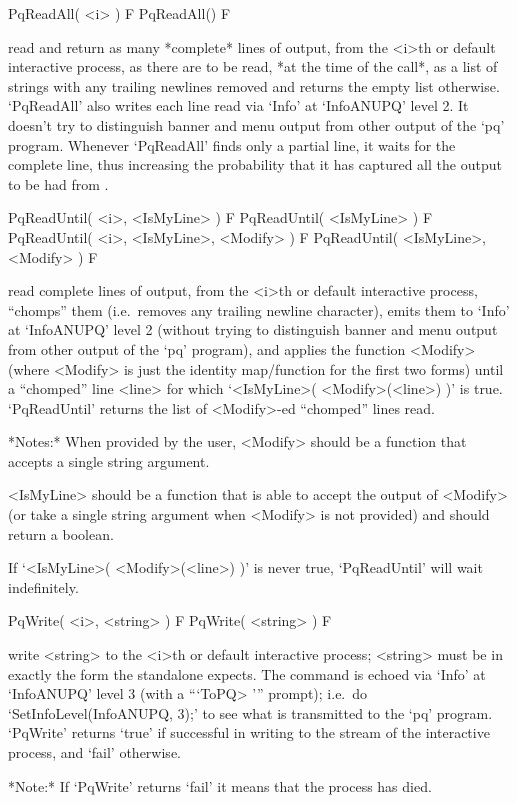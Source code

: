 \>PqReadAll( <i> ) F
\>PqReadAll() F

read and return as many *complete* lines of  {\ANUPQ}  output,  from  the
<i>th or default interactive {\ANUPQ} process, as there are to  be  read,
*at the time of the call*,  as  a  list  of  strings  with  any  trailing
newlines removed and returns the empty list otherwise.  `PqReadAll'  also
writes each line read via `Info' at `InfoANUPQ' level 2. It  doesn't  try
to distinguish banner and menu output  from  other  output  of  the  `pq'
program. Whenever `PqReadAll' finds only a partial line, it waits for  the
complete line, thus increasing the probability that it has  captured  all
the output to be had from {\ANUPQ}.

\>PqReadUntil( <i>, <IsMyLine> ) F
\>PqReadUntil( <IsMyLine> ) F
\>PqReadUntil( <i>, <IsMyLine>, <Modify> ) F
\>PqReadUntil( <IsMyLine>, <Modify> ) F

read complete lines  of  {\ANUPQ}  output,  from  the  <i>th  or  default
interactive {\ANUPQ} process, ``chomps'' them (i.e.~removes any  trailing
newline character), emits them to `Info' at `InfoANUPQ' level 2  (without
trying to distinguish banner and menu output from  other  output  of  the
`pq' program), and applies the function <Modify> (where <Modify>  is  just
the identity map/function for the first two forms)  until  a  ``chomped''
line  <line>  for  which  `<IsMyLine>(  <Modify>(<line>)  )'   is   true.
`PqReadUntil' returns the list of <Modify>-ed ``chomped'' lines read.

*Notes:* 
When provided by the user, <Modify> should be a function that  accepts  a
single string argument.

<IsMyLine> should be a function that is able  to  accept  the  output  of
<Modify> (or take a single string argument when <Modify> is not provided)
and should return a boolean.

If `<IsMyLine>( <Modify>(<line>) )' is  never  true,  `PqReadUntil'  will
wait indefinitely.

\>PqWrite( <i>, <string> ) F
\>PqWrite( <string> ) F

write <string> to the <i>th  or  default  interactive  {\ANUPQ}  process;
<string> must be in exactly the form the {\ANUPQ} standalone expects. The
command is echoed via `Info' at `InfoANUPQ' level 3 (with a  ```ToPQ> '''
prompt); i.e.~do `SetInfoLevel(InfoANUPQ, 3);' to see what is transmitted
to the `pq' program. `PqWrite' returns `true' if successful in writing  to
the stream of the interactive {\ANUPQ} process, and `fail' otherwise.

*Note:*
If `PqWrite' returns `fail' it means that the {\ANUPQ} process has died.

